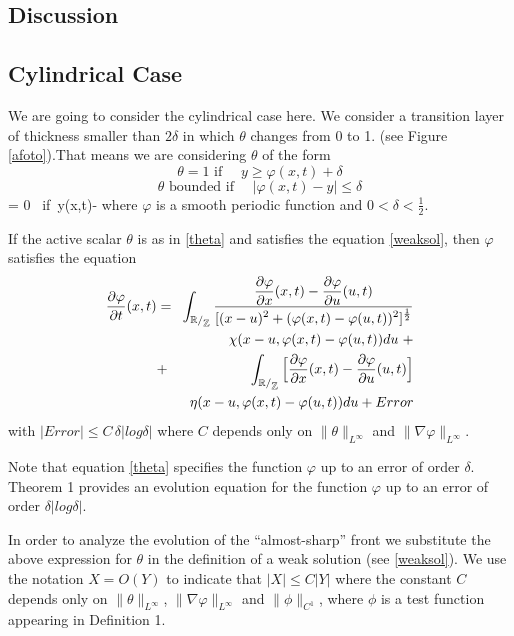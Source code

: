 \documentclass{pnastwo}
\begin{document}
\begin{article}
\section{Discussion}
\subsection{Cylindrical Case}
We are going to consider the cylindrical case here. We consider a
transition layer of thickness smaller than $2\delta$ in which
 $\theta$ changes from 0 to 1. (see Figure \ref{afoto}).That means we are considering $\theta$  of the form
\[
\theta  = 1   \mbox{ if }\quad  y\geq \varphi(x,t)+\delta
\]
\[
\theta \mbox{ bounded} \mbox{ if }\quad |\varphi(x,t)-y|\leq\delta
\]
\be \theta = 0  \mbox{ if }\quad  y\leq \varphi(x,t)-\delta
\label{theta} \ee
where $\varphi$ is a smooth periodic function and
$0<\delta<\frac{1}{2}$.


\begin{theorem}
If the active scalar $\theta$ is as in \eqref{theta} and satisfies
the equation \eqref{weaksol}, then $\varphi$ satisfies the
equation
\begin{eqnarray}
\mfrac{\pr \varphi}{\pr t}(x,t)&=&\hspace{-2pt}\dst
\int_{\fd}\mfrac{\mfrac{\pr \varphi}{\pr x}(x,t)-\mfrac{\pr
\varphi}{\pr
u}(u,t)}{[(x-u)^{2}+(\varphi(x,t)-\varphi(u,t))^{2}]^{\f12}}\nonumber\\
&&
\chi(x-u,\varphi(x,t)-\varphi(u,t)) du \hspace{3pt} +
\nonumber\\
&+&\dst \int_{\fd} \Big{[}\mfrac{\pr \varphi} {\pr
x}(x,t)-\mfrac{\pr \varphi}{\pr u} (u,t)\Big{]}
\nonumber\\&&
\eta(x-u,\varphi(x,t)-\varphi(u,t)) du + Error
\end{eqnarray}
with $|Error|\leq C\, \delta | log\delta| $ where $C$ depends only
on $\|\theta\|_{L^{\infty}}$ and $\|
\nabla\varphi\|_{L^{\infty}}$.
\end{theorem}

\begin{remark}
Note that equation \eqref{theta} specifies  the function $\varphi$
up to an error of order $\delta$. Theorem 1 provides an evolution
equation for the function $\varphi$ up to an error of order
$\delta |log \delta|$.
\end{remark}

In order to analyze the evolution of the ``almost-sharp'' front we
substitute the above expression for $\theta$ in the definition of
a weak solution (see \eqref{weaksol}). We use the notation $X =O(
Y)$ to indicate that $|X|\leq C |Y|$ where the constant $C$
depends only on $\|\theta\|_{L^{\infty}}$, $\|
\nabla\varphi\|_{L^{\infty}}$ and $\|\phi\|_{C^1}$, where $\phi$
is a test function appearing in Definition 1.


\end{article}
\end{document}
